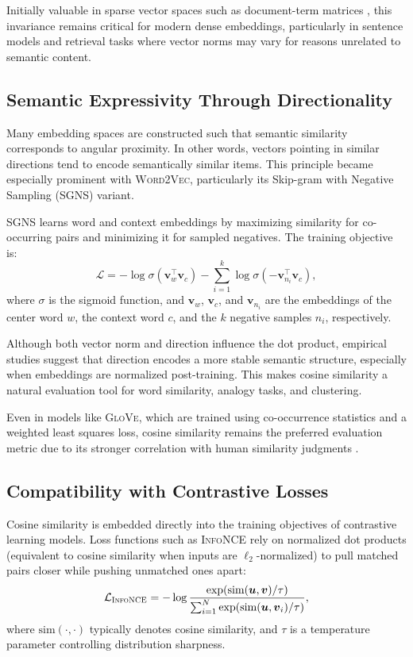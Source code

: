 \documentclass[11pt]{article}
\newcommand{\bfu}{\boldsymbol{u}}
\newcommand{\bfv}{\boldsymbol{v}}
\newcommand{\calL}{\mathcal{L}}
\begin{document}
Initially valuable in sparse vector spaces such as document-term matrices \citep{salton_1975_VectorSpaceModel}, this invariance remains critical for modern dense embeddings, particularly in sentence models and retrieval tasks where vector norms may vary for reasons unrelated to semantic content.

\subsection{Semantic Expressivity Through Directionality}

Many embedding spaces are constructed such that semantic similarity corresponds to angular proximity. In other words, vectors pointing in similar directions tend to encode semantically similar items. This principle became especially prominent with \textsc{Word2Vec}, particularly its Skip-gram with Negative Sampling (SGNS) variant.

SGNS learns word and context embeddings by maximizing similarity for co-occurring pairs and minimizing it for sampled negatives. The training objective is:
\begin{equation*}
	\calL = -\log \sigma (\bfv_w^\top \bfv_c) - \sum_{i=1}^k \log \sigma(-\bfv_{n_i}^\top \bfv_c),
\end{equation*}
where $\sigma$ is the sigmoid function, and $\bfv_w$, $\bfv_c$, and $\bfv_{n_i}$ are the embeddings of the center word $w$, the context word $c$, and the $k$ negative samples $n_i$, respectively.

Although both vector norm and direction influence the dot product, empirical studies suggest that direction encodes a more stable semantic structure, especially when embeddings are normalized post-training. This makes cosine similarity a natural evaluation tool for word similarity, analogy tasks, and clustering.

Even in models like \textsc{GloVe}, which are trained using co-occurrence statistics and a weighted least squares loss, cosine similarity remains the preferred evaluation metric due to its stronger correlation with human similarity judgments \citep{schutze_1998_AutomaticWordSense}.


\subsection{Compatibility with Contrastive Losses}

Cosine similarity is embedded directly into the training objectives of contrastive learning models. Loss functions such as \textsc{InfoNCE} rely on normalized dot products (equivalent to cosine similarity when inputs are $\ell_2$-normalized) to pull matched pairs closer while pushing unmatched ones apart:
\begin{equation*}
	\calL_{\textsc{InfoNCE}} = -\log \frac{\exp(\text{sim}(\bfu, \bfv)/\tau)}{\sum_{i=1}^N \exp(\text{sim}(\bfu, \bfv_i)/\tau)},
\end{equation*}
where $\text{sim}(\cdot, \cdot)$ typically denotes cosine similarity, and $\tau$ is a temperature parameter controlling distribution sharpness.
\end{document}
